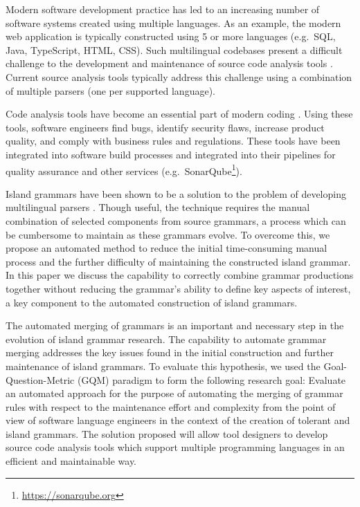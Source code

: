 \documentclass[conference]{IEEEtran}
\begin{document}
Modern software development practice has led to an increasing number of
software systems created using multiple languages. As an example, the
modern web application is typically constructed using 5 or more
languages (e.g.~SQL, Java, TypeScript, HTML, CSS). Such multilingual
codebases present a difficult challenge to the development and
maintenance of source code analysis tools
\cite{mushtaqMultilingualSourceCode2017}. Current source analysis tools
typically address this challenge using a combination of multiple parsers
(one per supported language).

Code analysis tools have become an essential part of modern coding
\cite{kirkovSourceCodeAnalysis}. Using these tools, software engineers
find bugs, identify security flaws, increase product quality, and comply
with business rules and regulations. These tools have been integrated
into software build processes and integrated into their pipelines for
quality assurance and other services
(e.g.~SonarQube\texttrademark \footnote{\url{https://sonarqube.org}}).

Island grammars have been shown to be a solution to the problem of
developing multilingual parsers
\cite{synytskyyRobustMultilingualParsing2003}. Though useful, the
technique requires the manual combination of selected components from
source grammars, a process which can be cumbersome to maintain as these
grammars evolve. To overcome this, we propose an automated method to
reduce the initial time-consuming manual process and the further
difficulty of maintaining the constructed island grammar. In this paper
we discuss the capability to correctly combine grammar productions
together without reducing the grammar's ability to define key aspects of
interest, a key component to the automated construction of island
grammars.

The automated merging of grammars is an important and necessary step in
the evolution of island grammar research. The capability to automate
grammar merging addresses the key issues found in the initial
construction and further maintenance of island grammars. To evaluate
this hypothesis, we used the Goal-Question-Metric (GQM) paradigm
\cite{caldieraGoalQuestionMetric1994} to form the following research
goal: Evaluate an automated approach for the purpose of automating the
merging of grammar rules with respect to the maintenance effort and
complexity from the point of view of software language engineers in the
context of the creation of tolerant and island grammars. The solution
proposed will allow tool designers to develop source code analysis tools
which support multiple programming languages in an efficient and
maintainable way.
\end{document}
